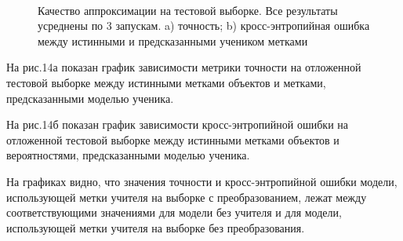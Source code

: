 \begin{figure}[h!t]\center
{}
\\
\caption{Качество аппроксимации на тестовой выборке. Все результаты усреднены по 3 запускам. a) точность; b) кросс-энтропийная ошибка между истинными и предсказанными учеником метками}
\end{figure}

На рис.14а показан график зависимости метрики точности на отложенной тестовой выборке между истинными метками объектов и метками, предсказанными моделью ученика.

На рис.14б показан график зависимости кросс-энтропийной ошибки на отложенной тестовой выборке между истинными метками объектов и вероятностями, предсказанными моделью ученика.

На графиках видно, что значения точности и кросс-энтропийной ошибки модели, использующей метки учителя на выборке с преобразованием, лежат между соответствующими значениями для модели без учителя и для модели, использующей метки учителя на выборке без преобразования.


